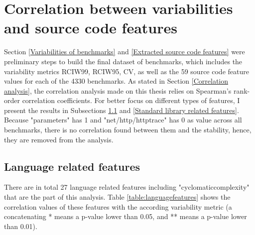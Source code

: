\documentclass{seal_thesis}
\begin{document}
\section{Correlation between variabilities and source code features}
\label{Correlation results}

Section \ref{Variabilities of benchmarks} and \ref{Extracted source code features} were preliminary steps to build the final dataset of benchmarks, which includes the variability metrics RCIW99, RCIW95, CV, as well as the 59 source code feature values for each of the 4330 benchmarks. As stated in Section \ref{Correlation analysis}, the correlation analysis made on this thesis relies on Spearman's rank-order correlation coefficients. For better focus on different types of features, I present the results in Subsections \ref{Language related features} and \ref{Standard library related features}. Because "parameters" has 1 and "net/http/httptrace" has 0 as value across all benchmarks, there is no correlation found between them and the stability, hence, they are removed from the analysis.

\subsection{Language related features}
\label{Language related features}

There are in total 27 language related features including "cyclomaticcomplexity" that are the part of this analysis. Table \ref{table:languagefeatures} shows the correlation values of these features with the according variability metric (a concatenating * means a p-value lower than 0.05, and ** means a p-value lower than 0.01).
\end{document}
